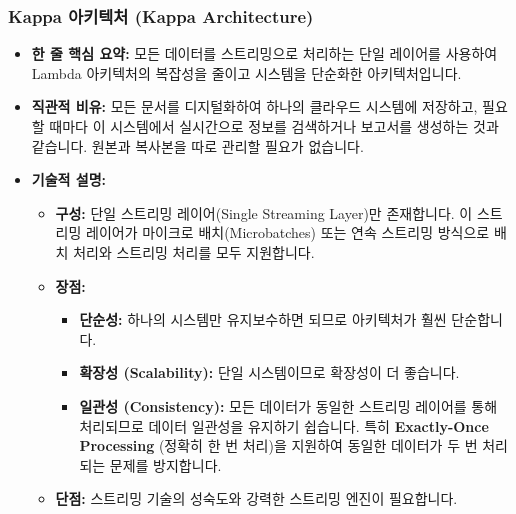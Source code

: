 \documentclass[11pt,a4paper]{article}
\begin{document}
\subsubsection{Kappa 아키텍처 (Kappa Architecture)}
\begin{itemize}
    \item \textbf{한 줄 핵심 요약:} 모든 데이터를 스트리밍으로 처리하는 단일 레이어를 사용하여 Lambda 아키텍처의 복잡성을 줄이고 시스템을 단순화한 아키텍처입니다.
    \item \textbf{직관적 비유:} 모든 문서를 디지털화하여 하나의 클라우드 시스템에 저장하고, 필요할 때마다 이 시스템에서 실시간으로 정보를 검색하거나 보고서를 생성하는 것과 같습니다. 원본과 복사본을 따로 관리할 필요가 없습니다.
    \item \textbf{기술적 설명:}
    \begin{itemize}
        \item \textbf{구성:} 단일 스트리밍 레이어(Single Streaming Layer)만 존재합니다. 이 스트리밍 레이어가 마이크로 배치(Microbatches) 또는 연속 스트리밍 방식으로 배치 처리와 스트리밍 처리를 모두 지원합니다.
        \item \textbf{장점:}
        \begin{itemize}
            \item \textbf{단순성:} 하나의 시스템만 유지보수하면 되므로 아키텍처가 훨씬 단순합니다.
            \item \textbf{확장성 (Scalability):} 단일 시스템이므로 확장성이 더 좋습니다.
            \item \textbf{일관성 (Consistency):} 모든 데이터가 동일한 스트리밍 레이어를 통해 처리되므로 데이터 일관성을 유지하기 쉽습니다. 특히 \textbf{Exactly-Once Processing} (정확히 한 번 처리)을 지원하여 동일한 데이터가 두 번 처리되는 문제를 방지합니다.
        \end{itemize}
        \item \textbf{단점:} 스트리밍 기술의 성숙도와 강력한 스트리밍 엔진이 필요합니다.
    \end{itemize}
\end{itemize}
\end{document}
